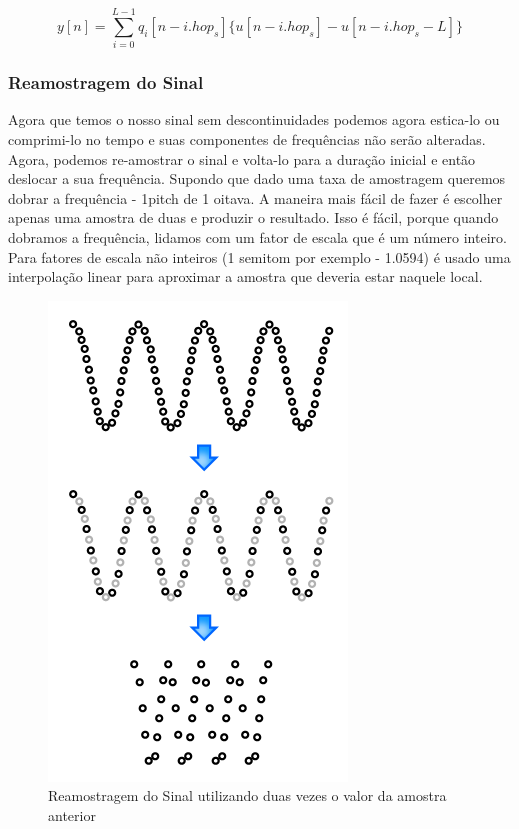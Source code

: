 					\begin{equation}
						\label{eq-overlap-sintese}
						y[n] = \sum_{i=0}^{L-1} q_i[n-i.hop_s]\{ u[n-i.hop_s]-u[n-i.hop_s-L]\} 
					\end{equation}
			
			\subsubsection{Reamostragem do Sinal}
				
				Agora que temos o nosso sinal sem descontinuidades podemos agora estica-lo ou comprimi-lo no tempo e suas componentes de frequências não serão alteradas. Agora, podemos re-amostrar o sinal 	e volta-lo para a duração inicial e então deslocar a sua frequência. Supondo que dado uma taxa de amostragem queremos dobrar a frequência - 1pitch de 1 oitava. A maneira mais fácil de fazer é escolher apenas uma amostra de duas e produzir o resultado. Isso é fácil, porque quando dobramos a frequência, lidamos com um fator de escala que é um número inteiro. Para fatores de escala não inteiros (1 semitom por exemplo - 1.0594) é usado uma interpolação linear para aproximar a amostra que deveria estar naquele local.
				
				\begin{figure}[!ht]
					\centering
					\includegraphics[scale=0.7]{./figuras/phase-vocoder-05.PNG}
					\caption{Reamostragem do Sinal utilizando duas vezes o valor da amostra anterior}
				\end{figure}
					
